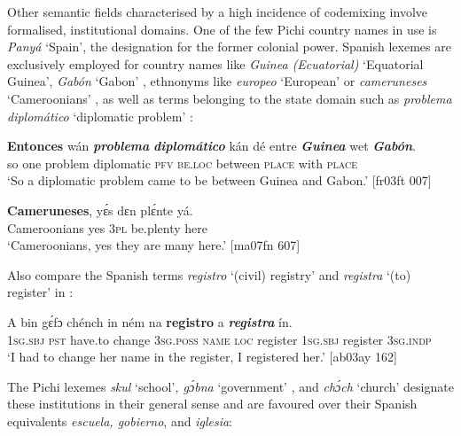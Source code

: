 Other semantic fields characterised by a high incidence of codemixing involve formalised, institutional domains. One of the few Pichi country names in use is \textit{Panyá} ‘Spain’, the designation for the former colonial power. Spanish lexemes are exclusively employed for country names like \textit{Guinea (Ecuatorial)} ‘Equatorial Guinea’, \textit{Gabón} ‘Gabon’ , ethnonyms like \textit{europeo} ‘European’ or \textit{cameruneses} ‘Cameroonians’ , as well as terms belonging to the state domain such as \textit{problema diplomático} ‘diplomatic problem’ : 


\ea%
    \label{ex:key:1754}
    \gll \textbf{Entonces}    wán    \textbf{\textit{problema}}  \textbf{\textit{diplomático}}  kán  dé    entre
\textbf{\textit{Guinea}}  wet    \textbf{\textit{Gabón}}.\\
so      one    problem    diplomatic  \textsc{pfv}  \textsc{be.loc}  between
\textsc{place}  with    \textsc{place}\\

\glt ‘So a diplomatic problem came to be between Guinea and Gabon.’ [fr03ft 007]
\z


\ea%
    \label{ex:key:1755}
    \gll \textbf{Cameruneses},    yɛ́s  dɛn  plɛ́nte    yá.\\
Cameroonians  yes  \textsc{3pl}  be.plenty  here\\

\glt ‘Cameroonians, yes they are many here.’ [ma07fn 607]
\z

Also compare the Spanish terms \textit{registro} ‘(civil) registry’ and \textit{registra} ‘(to) register’ in :


\ea%
    \label{ex:key:1756}
    \gll A    bin  gɛ́fɔ    chénch  in    ném    na  \textbf{registro}  
a    \textbf{\textit{registra}}  ín.\\
\textsc{1sg.sbj}  \textsc{pst}  have.to  change  \textsc{3sg.poss}  \textsc{name}  \textsc{loc}  register  
\textsc{1sg.sbj}  register  \textsc{3sg.indp}\\

\glt ‘I had to change her name in the register, I registered her.’ [ab03ay 162]
\z

The Pichi lexemes \textit{skul} ‘school’\textit{, gɔ́bna} ‘government’ , and \textit{chɔ́ch} ‘church’  designate these institutions in their general sense and are favoured over their Spanish equivalents \textit{escuela, gobierno}, and\textit{ iglesia}:


